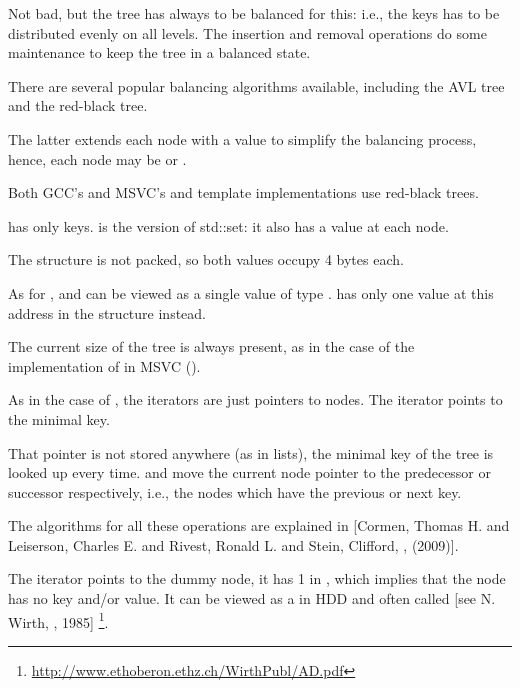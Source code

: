 Not bad, but the tree has always to be balanced for this: i.e., the keys has to be distributed evenly on all levels.
The insertion and removal operations do some maintenance to keep the tree in a balanced state.

There are several popular balancing algorithms available, including the AVL tree and the red-black tree.

The latter extends each node with a  value to simplify the balancing process, hence, 
each node may be  or .

Both GCC's and MSVC's  and  template implementations use red-black trees.

 has only keys.
 is the  version of std::set: it also has a value at each node.






The structure is not packed, so both \Tchar values occupy 4 bytes each.

As for ,  and  can be viewed as a single value of type .
has only one value at this address in the structure instead.

The current size of the tree is always present, as in the case of the implementation of  in MSVC ().

As in the case of , 
the iterators are just pointers to nodes.
The  iterator points to the minimal key.

That pointer is not stored anywhere (as in lists), the minimal key of the tree is looked up every time.
 and  
move the current node pointer to the predecessor or successor respectively, i.e., the nodes which have the previous or next key.

The algorithms for all these operations are explained in
[Cormen, Thomas H. and Leiserson, Charles E. and Rivest, Ronald L. and Stein, Clifford,
, (2009)].

The  iterator points to the dummy node, it has 1 in , which implies that 
the node has no key and/or value.
It can be viewed as a  in \ac{HDD}
and often called  [see N. Wirth, , 1985]
\footnote{\url{http://www.ethoberon.ethz.ch/WirthPubl/AD.pdf}}.

